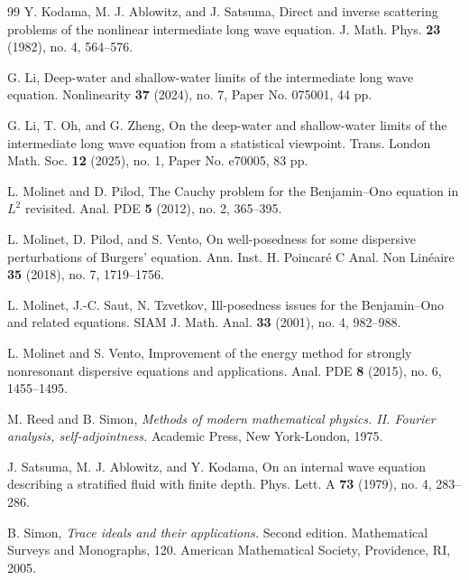 \documentclass{amsart}
\theoremstyle{definition}
\theoremstyle{remark}
\begin{document}
\begin{thebibliography}{99}
Y. Kodama, M. J. Ablowitz, and J. Satsuma,
Direct and inverse scattering problems of the nonlinear intermediate long wave equation.
J. Math. Phys. \textbf{23} (1982), no. 4,  564--576.

G. Li,
Deep-water and shallow-water limits of the intermediate long wave equation.
Nonlinearity \textbf{37} (2024), no. 7, Paper No. 075001, 44 pp.

G. Li, T. Oh, and G. Zheng,
On the deep-water and shallow-water limits of the intermediate long wave equation from a statistical viewpoint.
Trans. London Math. Soc. \textbf{12} (2025), no. 1, Paper No. e70005, 83 pp.

L. Molinet and D. Pilod, The Cauchy problem for the Benjamin--Ono equation in $L^2$ revisited. Anal. PDE \textbf{5} (2012), no. 2, 365--395.

L. Molinet, D. Pilod, and S. Vento, On well-posedness for some dispersive perturbations of Burgers' equation.
Ann. Inst. H. Poincar\'e C Anal. Non Lin\'eaire \textbf{35} (2018), no. 7, 1719--1756.

L. Molinet, J.-C. Saut, N. Tzvetkov, Ill-posedness issues for the Benjamin--Ono and related equations.
SIAM J. Math. Anal. \textbf{33} (2001), no. 4, 982--988.

L. Molinet and S. Vento, Improvement of the energy method for strongly nonresonant dispersive equations and applications. Anal. PDE \textbf{8} (2015), no. 6, 1455--1495.

M. Reed and B. Simon,
\emph{Methods of modern mathematical physics. II. Fourier analysis, self-adjointness.} Academic Press, New York-London, 1975.

J. Satsuma, M. J. Ablowitz, and Y. Kodama,
On an internal wave equation describing a stratified fluid with finite depth.
Phys. Lett. A \textbf{73} (1979), no. 4, 283--286.

B. Simon,
\emph{Trace ideals and their applications.}
Second edition. Mathematical Surveys and Monographs, 120. American Mathematical Society, Providence, RI, 2005. 

\end{thebibliography}
\end{document}
